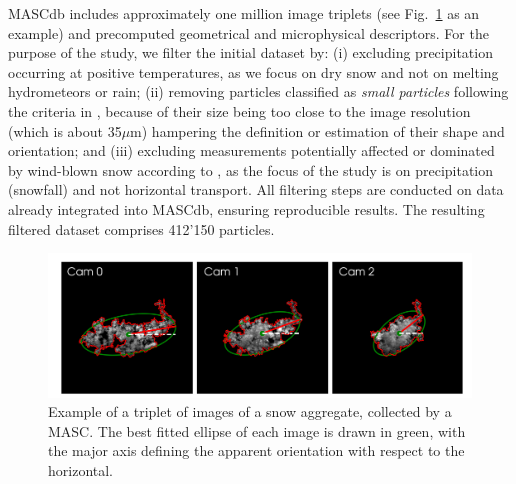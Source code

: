 \documentclass[draft]{agujournal2019}
\begin{document}
MASCdb includes approximately one million image triplets (see Fig.~\ref{fig:triplet} as an example) and precomputed geometrical and microphysical descriptors. For the purpose of the study, we filter the initial dataset by: (i) excluding precipitation occurring at positive temperatures, as we focus on dry snow and not on melting hydrometeors or rain; (ii) removing particles classified as \textit{small particles} following the criteria in \cite{Praz_AMT_2017}, because of their size being too close to the image resolution (which is about 35$\mu$m) hampering the definition or estimation of their shape and orientation; and (iii) excluding measurements potentially affected or dominated by wind-blown snow according to \cite{Schaer_TC_2020}, as the focus of the study is on precipitation (snowfall) and not horizontal transport. All filtering steps are conducted on data already integrated into MASCdb, ensuring reproducible results. The resulting filtered dataset comprises 412'150 particles.

\begin{figure}
 \noindent\includegraphics[width=\textwidth]{Fig01.png}
\caption{Example of a triplet of images of a snow aggregate, collected by a MASC. The best fitted ellipse of each image is drawn in green, with the major axis defining the apparent orientation with respect to the horizontal.    }
\label{fig:triplet}
\end{figure}
\end{document}
